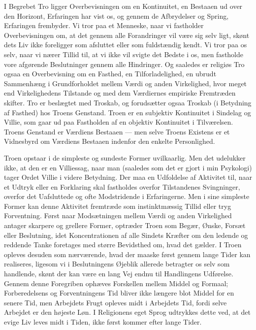 \documentclass[12pt,a4paper,openany]{book}
\newcommand{\opage}[1]{\marginnote{\footnotesize\textit{[#1]}}}
\begin{document}
I Begrebet Tro ligger Overbevisningen om en Kontinuitet, en Bestaaen ud
over den Horizont, Erfaringen har vist os, og gennem de Afbrydelser og
Spring, Erfaringen frembyder. Vi tror paa et Menneske, naar vi
fastholder Overbevisningen om, at det gennem alle Forandringer vil være
sig selv ligt, skønt dets Liv ikke foreligger som afsluttet eller som
fuldstændig kendt. Vi tror paa os selv, naar vi nærer Tillid til, at vi
ikke vil svigte det Bedste i os, men fastholde vore afgørende
Beslutninger gennem alle Hindringer. Og saaledes er religiøs Tro ogsaa
en Overbevisning om en Fasthed, en Tilforladelighed, en ubrudt
Sammenhæng i Grundforholdet mellem Værdi og anden Virkelighed, hvor
meget end Virkelighedens Tilstande og med dem Værdiernes empiriske
Fremtræden skifter. Tro er beslægtet med Troskab, og forudsætter ogsaa
Troskab (i Betydning af Fasthed) hos Troens Genstand. Troen er en
subjektiv Kontinuitet i Sindelag og Villie, som gaar ud paa Fastholden
af en objektiv Kontinuitet i Tilværelsen. Troens Genstand er Værdiens
Bestaaen --- men selve Troens Existens er et Vidnesbyrd om Værdiens
Bestaaen indenfor den enkelte Personlighed.

Troen opstaar i de simpleste og sundeste Former uvilkaarlig. Men det
udelukker ikke, at den er en Villiessag, naar man (saaledes
\opage{71}som det er gjort i min Psykologi) tager Ordet Villie i videre
Betydning. Der maa en Udfoldelse af Aktivitet til, naar et Udtryk eller
en Forklaring skal fastholdes overfor Tilstandenes Svingninger, overfor
det Uafsluttede og ofte Modstridende i Erfaringerne. Men i sine
simpleste Former kan denne Aktivitet fremtræde som instinktmæssig Tillid
eller tryg Forventning. Først naar Modsætningen mellem Værdi og anden
Virkelighed antager skarpere og grellere Former, optræder Troen som
Begær, Ønske, Forsæt eller Beslutning, idet Koncentrationen af alle
Sindets Kræfter om den ledende og reddende Tanke foretages med større
Bevidsthed om, hvad det gælder. I Troen opleves desuden som nærværende,
hvad der maaske først gennem lange Tider kan realiseres, ligesom vi i
Beslutningens Øjeblik allerede betragter os selv som handlende, skønt
der kan være en lang Vej endnu til Handlingens Udførelse. Gennem denne
Foregriben ophæves Forskellen mellem Middel og Formaal; Forberedelsens
og Forventningens Tid bliver ikke længere blot Middel for en senere Tid,
men Arbejdets Frugt opleves midt i Arbejdets Tid, fordi selve Arbejdet
er den højeste Løn. I Religionens eget Sprog udtrykkes dette ved, at det
evige Liv leves midt i Tiden, ikke først kommer efter lange Tider.
\end{document}
